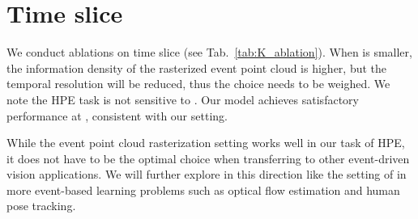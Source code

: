 \documentclass[10pt,twocolumn,letterpaper]{article}
\begin{document}
\section{Time slice }
We conduct ablations on time slice 
(see Tab.~\ref{tab:K_ablation}).
When  is smaller, the information density of the rasterized event point cloud is higher, but the temporal resolution will be reduced, thus the choice needs to be weighed. We note the HPE task is not sensitive to . Our model achieves satisfactory performance at , consistent with our setting.

While the event point cloud rasterization setting works well in our task of HPE, it does not have to be the optimal choice when transferring to other event-driven vision applications. We will further explore in this direction like the setting of  in more event-based learning problems such as optical flow estimation and human pose tracking.

\begin{table}[h]
\renewcommand\thetable{A}
\footnotesize
         \caption{Ablation experiment on .}
\label{tab:K_ablation}
\end{table}
\end{document}
